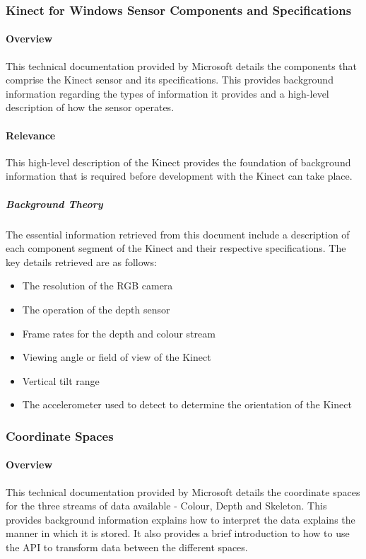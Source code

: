\subsubsection{Kinect for Windows Sensor Components and Specifications \cite{msdnKinectSpecs2017}}

\paragraph{Overview}
This technical documentation provided by Microsoft details the components that comprise the Kinect sensor and its specifications. This provides background information regarding the types of information it provides and a high-level description of how the sensor operates.

\paragraph{Relevance}
This high-level description of the Kinect provides the foundation of background information that is required before development with the Kinect can take place. 

\subparagraph{Background Theory}
The essential information retrieved from this document include a description of each component segment of the Kinect and their respective specifications. The key details retrieved are as follows: 
\begin{itemize}
	\item The resolution of the RGB camera
	\item The operation of the depth sensor
	\item Frame rates for the depth and colour stream
	\item Viewing angle or field of view of the Kinect
	\item Vertical tilt range
	\item The accelerometer used to detect to determine the orientation of the Kinect 
\end{itemize}

\subsubsection{Coordinate Spaces \cite{msdnCoSpaces2017}}

\paragraph{Overview}
This technical documentation provided by Microsoft details the coordinate spaces for the three streams of data available - Colour, Depth and Skeleton. This provides background information explains how to interpret the data explains the manner in which it is stored. It also provides a brief introduction to how to use the API to transform data between the different spaces.

